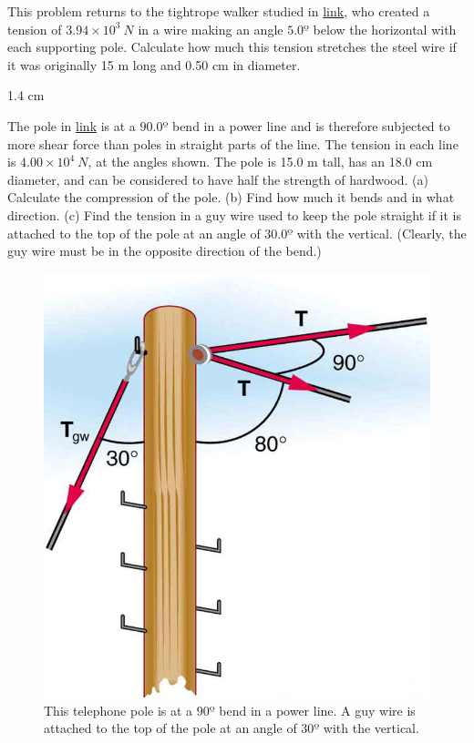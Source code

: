 \documentclass[
]{book}
\begin{document}
\hypertarget{fs-id1165298740744}{}
\leavevmode{}%
This problem returns to the tightrope walker studied in
\href{/m54857\#fs-id986136}{link}, who created a
tension of \({3\text{.}{\text{94} \times \text{10}^{3}}\ N}{}\) in a wire
making an angle \(\text{5.0º}\) below the horizontal with each supporting
pole. Calculate how much this tension stretches the steel wire if it was
originally 15 m long and 0.50 cm in diameter.

\leavevmode{}%
1.4 cm

\hypertarget{fs-id1165296233210}{}
\leavevmode{}%
The pole in \protect\hyperlink{import-auto-id1165296309614}{link}
is at a \(\text{90.0º}\) bend in a power line and is therefore subjected
to more shear force than poles in straight parts of the line. The
tension in each line is
\({4\text{.}{\text{00} \times \text{10}^{4}}\ N}{}\), at the angles shown.
The pole is 15.0 m tall, has an 18.0 cm diameter, and can be considered
to have half the strength of hardwood. (a) Calculate the compression of
the pole. (b) Find how much it bends and in what direction. (c) Find the
tension in a guy wire used to keep the pole straight if it is attached
to the top of the pole at an angle of \(\text{30.0º}\) with the vertical.
(Clearly, the guy wire must be in the opposite direction of the bend.)

\begin{figure}
\hypertarget{import-auto-id1165296309614}{%
\centering
\includegraphics{images/Figure_06_03_10a.jpg}
\caption{This telephone pole is at a \({\text{90}\text{º}}{}\) bend in a power
line. A guy wire is attached to the top of the pole at an angle of
\({\text{30}\text{º}}{}\) with the
vertical.}\label{import-auto-id1165296309614}
}
\end{figure}
\end{document}

